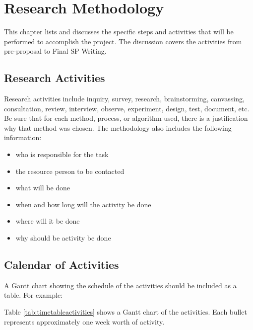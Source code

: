 \chapter{Research Methodology}
This chapter lists and discusses the specific steps and activities that will be performed  to accomplish the project. 
The discussion covers the activities from pre-proposal to Final SP Writing.

\section{Research Activities}
Research activities include inquiry, survey, research, brainstorming, canvassing, consultation, review, interview, observe, experiment, design, test, document, etc.  
Be sure that for each method, process, or algorithm used, there is a justification why that method was chosen.
The methodology also includes the following information:

\begin{itemize}
   \item who is responsible for the task
   \item the resource person to be contacted
   \item what will be done
   \item when and how long will the activity be done
   \item where will it be done
   \item why should be activity be done
\end{itemize}


\section{Calendar of Activities}

A Gantt chart showing the schedule of the activities should be included as a table. For example:

Table \ref{tab:timetableactivities} shows a Gantt chart of the activities.  Each bullet represents approximately
one week worth of activity.

%
%
\newcommand{\weekone}{\textbullet}
\newcommand{\weektwo}{\textbullet \textbullet}
\newcommand{\weekthree}{\textbullet \textbullet \textbullet}
\newcommand{\weekfour}{\textbullet \textbullet \textbullet \textbullet}

%
%
\begin{comment}
   \newcommand{\weekone}{$\star$}
   \newcommand{\weektwo}{$\star \star$}
   \newcommand{\weekthree}{$\star \star \star$}
   \newcommand{\weekfour}{$\star \star \star \star$ }
\end{comment}



